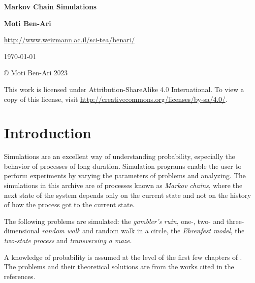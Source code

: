 \documentclass[11pt,a4paper]{article}
\begin{document}

\thispagestyle{empty}

\begin{center}
\textbf{\LARGE Markov Chain Simulations}

\bigskip
\bigskip
\bigskip

\textbf{\Large Moti Ben-Ari}

\bigskip

\url{http://www.weizmann.ac.il/sci-tea/benari/}

\bigskip
\bigskip
\bigskip

\today

\end{center}

\vfill

\begin{center}
\copyright{} Moti Ben-Ari $2023$
 \end{center}
 
\begin{small}
This work is licensed under Attribution-ShareAlike 4.0 International. To view a copy of this license, visit \url{http://creativecommons.org/licenses/by-sa/4.0/}.
\end{small}
\newpage

\tableofcontents

\newpage



\section{Introduction}

Simulations are an excellent way of understanding probability, especially the behavior of processes of long duration. Simulation programs enable the user to perform experiments by varying the parameters of problems and analyzing. The simulations in this archive are of processes known as \emph{Markov chains}, where the next state of the system depends only on the current state and not on the history of how the process got to the current state. 

The following problems are simulated: the \emph{gambler's ruin}, one-, two- and three-dimensional \emph{random walk} and random walk in a circle, the \emph{Ehrenfest model}, the \emph{two-state process} and \emph{transversing a maze}.

A knowledge of probability is assumed at the level of the first few chapters of \cite{BW,ross}. The problems and their theoretical solutions are from the works cited in the references.
\end{document}

